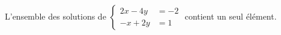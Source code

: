 L'ensemble des solutions de $\begin{cases}2x-4y &= -2 \\ -x+2y &= 1\end{cases}$ contient un seul élément.

\begin{reponses}
\end{reponses}

